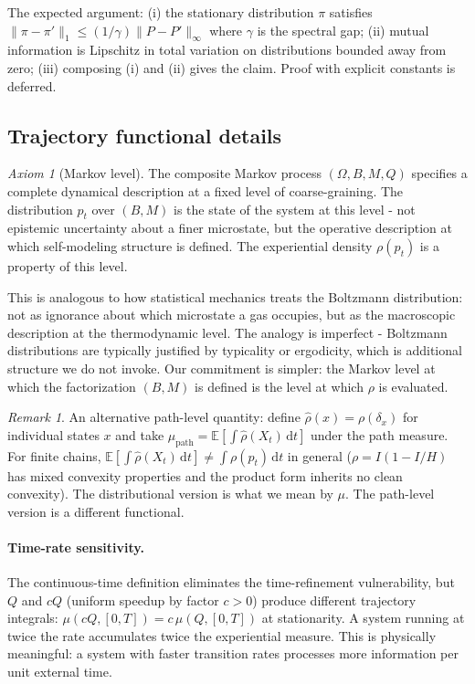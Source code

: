 \documentclass[12pt]{article}
\theoremstyle{remark}
\newtheorem{remark}[theorem]{Remark}
\newtheorem*{axiom}{Axiom}
\begin{document}
The expected argument: (i) the stationary distribution $\pi$ satisfies $\|\pi - \pi'\|_1 \leq (1/\gamma)\|P - P'\|_\infty$ where $\gamma$ is the spectral gap; (ii) mutual information is Lipschitz in total variation on distributions bounded away from zero; (iii) composing (i) and (ii) gives the claim. Proof with explicit constants is deferred.

\subsection{Trajectory functional details}\label{app:trajectory}

\begin{axiom}[Markov level]
The composite Markov process $(\Omega, B, M, Q)$ specifies a complete dynamical description at a fixed level of coarse-graining. The distribution $p_t$ over $(B, M)$ is the state of the system at this level - not epistemic uncertainty about a finer microstate, but the operative description at which self-modeling structure is defined. The experiential density $\rho(p_t)$ is a property of this level.
\end{axiom}

This is analogous to how statistical mechanics treats the Boltzmann distribution: not as ignorance about which microstate a gas occupies, but as the macroscopic description at the thermodynamic level. The analogy is imperfect - Boltzmann distributions are typically justified by typicality or ergodicity, which is additional structure we do not invoke. Our commitment is simpler: the Markov level at which the factorization $(B, M)$ is defined is the level at which $\rho$ is evaluated.

\begin{remark}
An alternative path-level quantity: define $\hat{\rho}(x) = \rho(\delta_x)$ for individual states $x$ and take $\mu_{\mathrm{path}} = \mathbb{E}[\int \hat{\rho}(X_t)\,\mathrm{d}t]$ under the path measure. For finite chains, $\mathbb{E}[\int \hat{\rho}(X_t)\,\mathrm{d}t] \neq \int \rho(p_t)\,\mathrm{d}t$ in general ($\rho = I(1-I/H)$ has mixed convexity properties and the product form inherits no clean convexity). The distributional version is what we mean by $\mu$. The path-level version is a different functional.
\end{remark}

\paragraph{Time-rate sensitivity.}
The continuous-time definition eliminates the time-refinement vulnerability, but $Q$ and $cQ$ (uniform speedup by factor $c > 0$) produce different trajectory integrals: $\mu(cQ, [0,T]) = c\,\mu(Q, [0,T])$ at stationarity. A system running at twice the rate accumulates twice the experiential measure. This is physically meaningful: a system with faster transition rates processes more information per unit external time.
\end{document}
